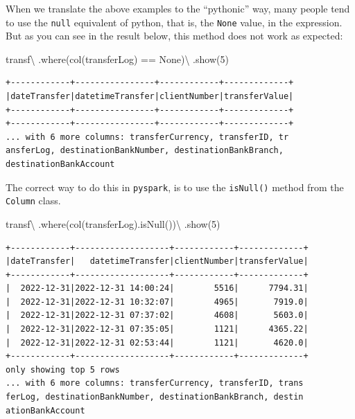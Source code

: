 \documentclass[
  11pt,
  letterpaper,
  DIV=11,
  numbers=noendperiod]{scrreprt}
\newenvironment{Shaded}{\begin{snugshade}}{\end{snugshade}}
\newcommand{\DecValTok}[1]{\textcolor[rgb]{0.68,0.00,0.00}{#1}}
\newcommand{\NormalTok}[1]{\textcolor[rgb]{0.00,0.23,0.31}{#1}}
\newcommand{\OperatorTok}[1]{\textcolor[rgb]{0.37,0.37,0.37}{#1}}
\newcommand{\StringTok}[1]{\textcolor[rgb]{0.13,0.47,0.30}{#1}}
\newcommand{\VariableTok}[1]{\textcolor[rgb]{0.07,0.07,0.07}{#1}}
\begin{document}
When we translate the above examples to the ``pythonic'' way, many
people tend to use the \texttt{null} equivalent of python, that is, the
\texttt{None} value, in the expression. But as you can see in the result
below, this method does not work as expected:

\begin{Shaded}
\begin{Highlighting}[]
\NormalTok{transf}\OperatorTok{\textbackslash{}}
\NormalTok{  .where(col(}\StringTok{\textquotesingle{}transferLog\textquotesingle{}}\NormalTok{) }\OperatorTok{==} \VariableTok{None}\NormalTok{)}\OperatorTok{\textbackslash{}}
\NormalTok{  .show(}\DecValTok{5}\NormalTok{)}
\end{Highlighting}
\end{Shaded}

\begin{verbatim}
+------------+----------------+------------+-------------+
|dateTransfer|datetimeTransfer|clientNumber|transferValue|
+------------+----------------+------------+-------------+
+------------+----------------+------------+-------------+
... with 6 more columns: transferCurrency, transferID, tr
ansferLog, destinationBankNumber, destinationBankBranch, 
destinationBankAccount
\end{verbatim}

The correct way to do this in \texttt{pyspark}, is to use the
\texttt{isNull()} method from the \texttt{Column} class.

\begin{Shaded}
\begin{Highlighting}[]
\NormalTok{transf}\OperatorTok{\textbackslash{}}
\NormalTok{  .where(col(}\StringTok{\textquotesingle{}transferLog\textquotesingle{}}\NormalTok{).isNull())}\OperatorTok{\textbackslash{}}
\NormalTok{  .show(}\DecValTok{5}\NormalTok{)}
\end{Highlighting}
\end{Shaded}

\begin{verbatim}
+------------+-------------------+------------+-------------+
|dateTransfer|   datetimeTransfer|clientNumber|transferValue|
+------------+-------------------+------------+-------------+
|  2022-12-31|2022-12-31 14:00:24|        5516|      7794.31|
|  2022-12-31|2022-12-31 10:32:07|        4965|       7919.0|
|  2022-12-31|2022-12-31 07:37:02|        4608|       5603.0|
|  2022-12-31|2022-12-31 07:35:05|        1121|      4365.22|
|  2022-12-31|2022-12-31 02:53:44|        1121|       4620.0|
+------------+-------------------+------------+-------------+
only showing top 5 rows
... with 6 more columns: transferCurrency, transferID, trans
ferLog, destinationBankNumber, destinationBankBranch, destin
ationBankAccount
\end{verbatim}
\end{document}
